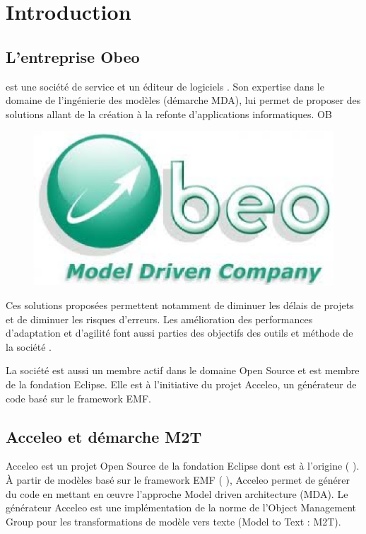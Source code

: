\chapter{Introduction}\label{chap:Intro}

\section{L'entreprise Obeo}
\kwobeo{} est une société de service et un éditeur de logiciels \cite{obeo}. Son expertise dans le domaine de l'ingénierie des modèles (démarche MDA), lui permet de proposer des solutions allant de la création à la refonte d'applications informatiques. 
 OB
\begin{figure}[htb]
  \centering
  \includegraphics[scale=.4]{img/logoobeo.eps}
  \label{fig:obeo}
\end{figure}

Ces solutions proposées permettent notamment de diminuer les délais de projets et de diminuer les risques d'erreurs. Les amélioration des performances d'adaptation et d'agilité font aussi parties des objectifs des outils et méthode de la société \kwobeo{}.

La société \kwobeo{} est aussi un membre actif dans le domaine Open Source et est membre de la fondation Eclipse. Elle est à l'initiative du projet Acceleo, un générateur de code basé sur le framework EMF. 


\section{Acceleo et démarche M2T}
Acceleo est un projet Open Source de la fondation Eclipse dont \kwobeo{} est à l'origine (\cf{} \cite{acceleo}). À partir de modèles basé sur le framework EMF (\cf{} \cite{emf}), Acceleo permet de générer du code en mettant en œuvre l'approche Model driven architecture (MDA). Le générateur Acceleo est une implémentation de la norme de l'Object Management Group \cite{omg} pour les transformations de modèle vers texte (Model to Text : M2T).


